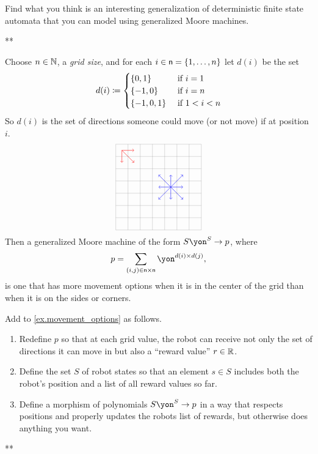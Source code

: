 \documentclass[Book-Poly]{subfiles}
\begin{document}
\begin{exercise}
Find what you think is an interesting generalization of deterministic finite state automata that you can model using generalized Moore machines.
\begin{solution}
**
\end{solution}
\end{exercise}

\begin{example}\label{ex.movement_options}
Choose $n\in\mathbb{N}$, a \emph{grid size}, and for each $i\in\mathsf{n}=\{1,\ldots,n\}$ let $d(i)$ be the set
\[
	d(i)\coloneqq
	\begin{cases}
		\{0,1\}&\textnormal{ if }i=1\\
		\{-1,0\}&\textnormal{ if }i=n\\
		\{-1,0,1\}&\textnormal{ if } 1<i<n
	\end{cases}
\]
So $d(i)$ is the set of directions someone could move (or not move) if at position $i$.
\[
\begin{tikzpicture}[scale=.5]
  \draw[step=1cm,gray,very thin] (-3,-3) grid (4,4);
	\draw[->, red ] (-2.5,3.5) -- (-1.5, 3.5);
	\draw[->, red ] (-2.5,3.5) -- (-1.5, 2.5);
	\draw[->, red ] (-2.5,3.5) -- (-2.5, 2.5);
	\draw[->, blue] (1.5, 0.5) -- (0.5, 0.5);
	\draw[->, blue] (1.5, 0.5) -- (2.5, 0.5);
	\draw[->, blue] (1.5, 0.5) -- (1.5, 1.5);
	\draw[->, blue] (1.5, 0.5) -- (1.5,-0.5);
	\draw[->, blue] (1.5, 0.5) -- (0.5, 1.5);
	\draw[->, blue] (1.5, 0.5) -- (0.5,-0.5);
	\draw[->, blue] (1.5, 0.5) -- (2.5, 1.5);
	\draw[->, blue] (1.5, 0.5) -- (2.5,-0.5);
\end{tikzpicture}
\]
Then a generalized Moore machine of the form $S\yon^S\to p$, where
\[
p= \sum_{(i,j)\in\ord{n}\times\ord{n}}\yon^{d(i)\times d(j)},
\]
is one that has more movement options when it is in the center of the grid than when it is on the sides or corners.
\end{example}

\begin{exercise}
Add to \cref{ex.movement_options} as follows.
\begin{enumerate}
	\item Redefine $p$ so that at each grid value, the robot can receive not only the set of directions it can move in but also a ``reward value'' $r\in\mathbb{R}$. 
	\item Define the set $S$ of robot states so that an element $s\in S$ includes both the robot's position and a list of all reward values so far.
	\item Define a morphism of polynomials $S\yon^S\to p$ in a way that respects positions and properly updates the robots list of rewards, but otherwise does anything you want.
\qedhere
\end{enumerate}
\begin{solution}
**
\end{solution}
\end{exercise}
\end{document}
